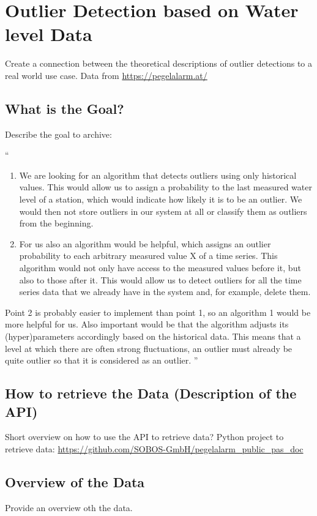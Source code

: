 \chapter{Outlier Detection based on Water level Data}
Create a connection between the theoretical descriptions of outlier detections to a real world use case. Data from \url{https://pegelalarm.at/}
\section{What is the Goal?}
Describe the goal to archive: \newline
\begin{itshape}
``
\begin{enumerate}
    \item We are looking for an algorithm that detects outliers using only historical values. This would allow us to assign a probability to the last measured water level of a station, which would indicate how likely it is to be an outlier. We would then not store outliers in our system at all or classify them as outliers from the beginning.
    \item For us also an algorithm would be helpful, which assigns an outlier probability to each arbitrary measured value X of a time series. This algorithm would not only have access to the measured values before it, but also to those after it. This would allow us to detect outliers for all the time series data that we already have in the system and, for example, delete them.

\end{enumerate}
Point 2 is probably easier to implement than point 1, so an algorithm 1 would be more helpful for us. 
Also important would be that the algorithm adjusts its (hyper)parameters accordingly based on the historical data. This means that a level at which there are often strong fluctuations, an outlier must already be quite outlier so that it is considered as an outlier.
''
\end{itshape}

\section{How to retrieve the Data (Description of the API)}
Short overview on how to use the API to retrieve data? Python project to retrieve data: \url{https://github.com/SOBOS-GmbH/pegelalarm_public_pas_doc}
\section{Overview of the Data}
Provide an overview oth the data.
